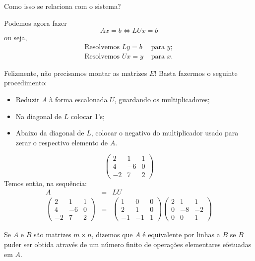 Como isso se relaciona com o sistema?
	
Podemos agora fazer
\begin{equation*}
	Ax = b \Leftrightarrow LUx = b
\end{equation*}
ou seja,
\begin{align*}
   \mbox{Resolvemos } Ly = b &\mbox{ para } y;\\
   \mbox{Resolvemos } Ux = y &\mbox{ para } x.
\end{align*}

Felizmente, não precisamos montar as matrizes $E$! Basta fazermos o seguinte procedimento:
\begin{itemize}
   \item Reduzir $A$ à forma escalonada $U$, guardando os multiplicadores;
	\item Na diagonal de $L$ colocar 1's;
	\item Abaixo da diagonal de $L$, colocar o negativo do multiplicador usado para zerar o respectivo elemento de $A$.
\end{itemize}

\begin{exemplo*}
	\begin{equation*}
	   \begin{pmatrix} 2&1&1\\4&-6&0\\-2&7&2 \end{pmatrix} 
	\end{equation*}
	Temos então, na sequência:
	\begin{eqnarray*}
		A & = & LU\\
		\begin{pmatrix}
			2&1&1\\4&-6&0\\-2&7&2
		\end{pmatrix}
		&
		=
		&
		\begin{pmatrix}
			1&0&0\\
			2&1&0\\
			-1&-1&1
		\end{pmatrix}
		\begin{pmatrix}
			2&1&1\\
			0&-8&-2\\
			0&0&1
		\end{pmatrix}
	\end{eqnarray*}
\end{exemplo*}

\begin{defi}
   Se $A$ e $B$ são matrizes $m\times n$, dizemos que $A$ é
equivalente por linhas a $B$ se $B$ puder ser obtida através de um
número finito de operações elementares efetuadas em $A$.
\end{defi}

